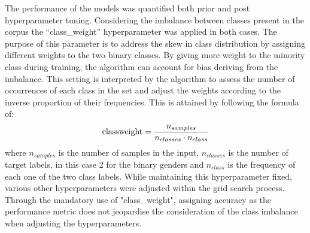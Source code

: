 \documentclass{l4proj}
\begin{document}
The performance of the models was quantified both prior and post hyperparameter tuning. Considering the imbalance between classes present in the corpus the “class\_weight” hyperparameter was applied in both cases. The purpose of this parameter is to address the skew in class distribution by assigning different weights to the two binary classes. By giving more weight to the minority class during training, the algorithm can account for bias deriving from the imbalance. This setting is interpreted by the algorithm to assess the number of occurrences of each class in the set and adjust the weights according to the inverse proportion of their frequencies. This is attained by following the formula of:
\begin{equation}
\text{{class\*weight}} = \frac{n_{samples}}{{n_{classes}} \cdot {n_{class}}}
\end{equation}
where $n_{samples}$ is the number of samples in the input, $n_{classes}$ is the number of target labels, in this case 2 for the binary genders and $n_{class}$ is the frequency of each one of the two class labels.
While maintaining this hyperparameter fixed, various other hyperparameters were adjusted within the grid search process. Through the mandatory use of "class\_weight", assigning accuracy as the performance metric does not jeopardise the consideration of the class imbalance when adjusting the hyperparameters.
\end{document}
